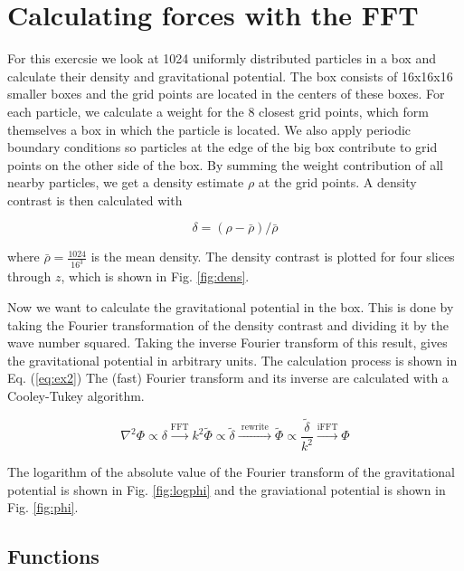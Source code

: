 \section{Calculating forces with the FFT}

For this exercsie we look at 1024 uniformly distributed particles in a box and calculate their density and gravitational potential. The box consists of 16x16x16 smaller boxes and the grid points are located in the centers of these boxes. For each particle, we calculate a weight for the 8 closest grid points, which form themselves a box in which the particle is located. We also apply periodic boundary conditions so particles at the edge of the big box contribute to grid points on the other side of the box. By summing the weight contribution of all nearby particles, we get a density estimate $\rho$ at the grid points. A density contrast is then calculated with

\begin{equation}
\delta=(\rho-\bar{\rho}) / \bar{\rho}
\end{equation}

where $\bar{\rho} = \frac{1024}{16^{3}}$ is the mean density. The density contrast is plotted for four slices through $z$, which is shown in Fig. \ref{fig:dens}.

Now we want to calculate the gravitational potential in the box. This is done by taking the Fourier transformation of the density contrast and dividing it by the wave number squared. Taking the inverse Fourier transform of this result, gives the gravitational potential in arbitrary units. The calculation process is shown in Eq. (\ref{eq:ex2}) The (fast) Fourier transform and its inverse are calculated with a Cooley-Tukey algorithm.

\begin{equation}\label{eq:ex2}
\nabla^{2} \Phi \propto \delta \stackrel{\mathrm{FFT}}{\longrightarrow} k^{2} \tilde{\Phi} \propto \tilde{\delta} \stackrel{\text { rewrite }}{\longrightarrow} \tilde{\Phi} \propto \frac{\tilde{\delta}}{k^{2}} \stackrel{\mathrm{iFFT}}{\longrightarrow} \Phi
\end{equation}

The logarithm of the absolute value of the Fourier transform of the gravitational potential is shown in Fig. \ref{fig:logphi} and the graviational potential is shown in Fig. \ref{fig:phi}.

\subsection{Functions}

